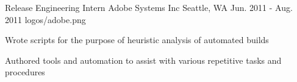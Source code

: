 \begin{cvexps}

\cvexp
    {Release Engineering Intern} %
    {Adobe Systems Inc} %
    {Seattle, WA} %
    {Jun. 2011 - Aug. 2011} %
    {logos/adobe.png} %
    { %
        \begin{cvitems}
            \item{Wrote scripts for the purpose of heuristic analysis of automated builds}
            \item{Authored tools and automation to assist with various repetitive tasks and procedures}
        \end{cvitems}
    }

\end{cvexps}